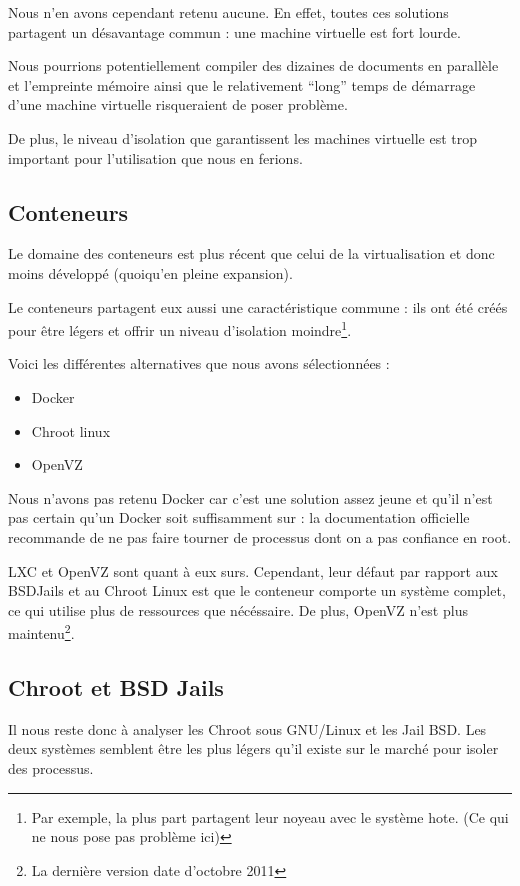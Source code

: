 \documentclass[10pt,a4paper]{article}
\begin{document}
Nous n'en avons cependant retenu aucune. En effet, toutes ces solutions partagent un désavantage commun : une machine virtuelle est fort lourde.

Nous pourrions potentiellement compiler des dizaines de documents en parallèle et l'empreinte mémoire ainsi que le relativement ``long'' temps de démarrage d'une machine virtuelle risqueraient de poser problème.

De plus, le niveau d'isolation que garantissent les machines virtuelle est trop important pour l'utilisation que nous en ferions.

\subsection{Conteneurs}
Le domaine des conteneurs est plus récent que celui de la virtualisation et donc moins développé (quoiqu'en pleine expansion).

Le conteneurs partagent eux aussi une caractéristique commune : ils ont été créés pour être légers et offrir un niveau d'isolation moindre\footnote{Par exemple, la plus part partagent leur noyeau avec le système hote. (Ce qui ne nous pose pas problème ici)}.

Voici les différentes alternatives que nous avons sélectionnées :

\begin{itemize}
    \item{Docker}
    \item{Chroot linux}
    \item{OpenVZ}
\end{itemize}

Nous n'avons pas retenu Docker car c'est une solution assez jeune et qu'il n'est pas certain qu'un Docker soit suffisamment sur : la documentation officielle recommande de ne pas faire tourner de processus dont on a pas confiance en root.

LXC et OpenVZ sont quant à eux surs.
Cependant, leur défaut par rapport aux BSDJails et au Chroot Linux est que le conteneur comporte un système complet, ce qui utilise plus de ressources que nécéssaire.
De plus, OpenVZ n'est plus maintenu\footnote{La dernière version date d'octobre 2011}.

\subsection{Chroot et BSD Jails}

Il nous reste donc à analyser les Chroot sous GNU/Linux et les Jail BSD.
Les deux systèmes semblent être les plus légers qu'il existe sur le marché pour isoler des processus.
\end{document}
